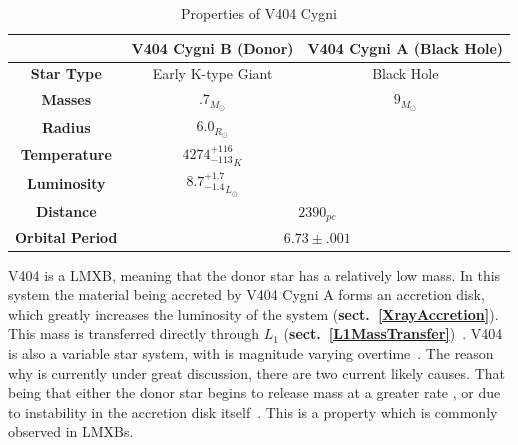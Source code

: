 \documentclass[12pt, a4paper]{article}
\begin{document}
        \begin{table} [H]
            \begin{center} 
                \begin{tabular}{||c || c | c||} 
                 \hline
                 & \textbf{V404 Cygni B (Donor)} & \textbf{V404 Cygni A (Black Hole)} \\ 
                 \hline\hline
                 \textbf{Star Type} & Early K-type Giant & Black Hole \\ 
                 \hline
                 \textbf{Masses}& $.7_{M_\odot}$ \parencite{Bernardini_2016} & $9_{M_\odot}$ \parencite{Shahbaz_1994} \parencite{Ziółkowski_2018} \\
                 \hline
                 \textbf{Radius} & $6.0_{R_\odot}$ \parencite{Shahbaz_1994} &  \\
                 \hline
                 \textbf{Temperature} & ${4274^{+116}_{-113}}_K$ \parencite{Ziółkowski_2018} & \\
                 \hline
                 \textbf{Luminosity} & ${8.7^{+1.7}_{-1.4}}_{L_\odot}$ \parencite{Ziółkowski_2018} &  \\ 
                 \hline
                 \textbf{Distance} & \multicolumn{2}{c||}{$2390_{pc}$ \parencite{Bernardini_2016}} \\
                 \hline
                 \textbf{Orbital Period} & \multicolumn{2}{c||}{$6.73 \pm .001$ \cite{Ziółkowski_2018}}\\
                 \hline  
            \end{tabular}
            \caption{Properties of V404 Cygni} 
            \label{V404Data} 
            \end{center}
        \end{table}

        V404 is a LMXB, meaning that the donor star has a relatively low mass. In this system the material being accreted by V404 Cygni A forms an accretion disk, which greatly increases the luminosity of the system (\textbf{sect.~\ref{XrayAccretion}}). This mass is transferred directly through $L_1$ (\textbf{sect.~\ref{L1MassTransfer}})~\parencite{Bartolomeo_2023}. V404 is also a variable star system, with is magnitude varying overtime~\parencite{Bernardini_2016}. The reason why is currently under great discussion, there are two current likely causes. That being that either the donor star begins to release mass at a greater rate \parencite{TanakaLewin_1995}, or due to instability in the accretion disk itself~\parencite{Lasota_2001}. This is a property which is commonly observed in LMXBs. 
\end{document}
